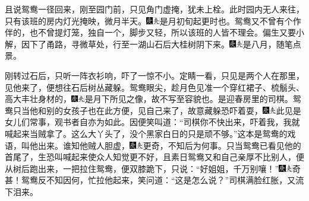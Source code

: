 且说鸳鸯一径回来，刚至园门前，只见角门虚掩，犹未上栓。此时园内无人来往，只有该班的房内灯光掩映，微月半天。{\includegraphics[width=3mm]{../Images/00004}\includegraphics[width=3mm]{../Images/00012}\footnotesize \kaishu 是月初旬起更时也。}鸳鸯又不曾有个作伴的，也不曾提灯笼，独自一个，脚步又轻，所以该班的人皆不理会。偏生又要小解，因下了甬路，寻微草处，行至一湖山石后大桂树阴下来。{\includegraphics[width=3mm]{../Images/00004}\includegraphics[width=3mm]{../Images/00012}\footnotesize \kaishu 是八月，随笔点景。}

刚转过石后，只听一阵衣衫响，吓了一惊不小。定睛一看，只见是两个人在那里，见他来了，便想往石后树丛藏躲。鸳鸯眼尖，趁月色见准一个穿红裙子、梳鬅头、高大丰壮身材的，{\includegraphics[width=3mm]{../Images/00004}\includegraphics[width=3mm]{../Images/00012}\footnotesize \kaishu 是月下所见之像，故不写至容貌也。}是迎春房里的司棋。鸳鸯只当他和别的女孩子也在此方便，见自己来了，故意藏躲恐吓着耍，{\includegraphics[width=3mm]{../Images/00004}\includegraphics[width=3mm]{../Images/00012}\footnotesize \kaishu 此见是女儿们常事，观书者自亦为如此。}因便笑叫道：“司棋你不快出来，吓着我，我就喊起来当贼拿了。这么大丫头了，没个黑家白日的只是顽不够。”这本是鸳鸯的戏语，叫他出来。谁知他贼人胆虚，{\includegraphics[width=3mm]{../Images/00004}\includegraphics[width=3mm]{../Images/00012}\footnotesize \kaishu 更奇，不知后为何事。}只当鸳鸯已看见他的首尾了，生恐叫喊起来使众人知觉更不好，且素日鸳鸯又和自己亲厚不比别人，便从树后跑出来，一把拉住鸳鸯，便双膝跪下，只说：“好姐姐，千万别嚷！”{\includegraphics[width=3mm]{../Images/00004}\includegraphics[width=3mm]{../Images/00012}\footnotesize \kaishu 奇甚！}鸳鸯反不知因何，忙拉他起来，笑问道：“这是怎么说？”司棋满脸红胀，又流下泪来。

